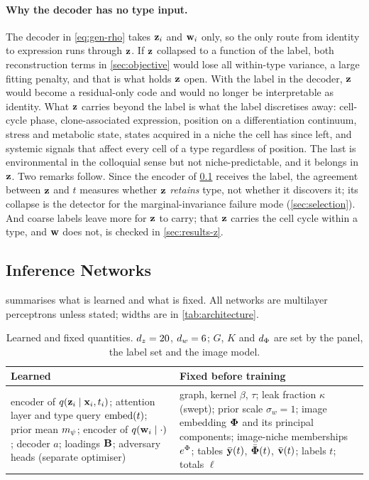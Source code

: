 \paragraph{Why the decoder has no type input.}
The decoder in \cref{eq:gen-rho} takes $\mathbf{z}_i$ and $\mathbf{w}_i$ only, so the only route from identity to expression runs through $\mathbf{z}$. If $\mathbf{z}$ collapsed to a function of the label, both reconstruction terms in \cref{sec:objective} would lose all within-type variance, a large fitting penalty, and that is what holds $\mathbf{z}$ open. With the label in the decoder, $\mathbf{z}$ would become a residual-only code and would no longer be interpretable as identity. What $\mathbf{z}$ carries beyond the label is what the label discretises away: cell-cycle phase, clone-associated expression, position on a differentiation continuum, stress and metabolic state, states acquired in a niche the cell has since left, and systemic signals that affect every cell of a type regardless of position. The last is environmental in the colloquial sense but not niche-predictable, and it belongs in $\mathbf{z}$. Two remarks follow. Since the encoder of \cref{sec:inference} receives the label, the agreement between $\mathbf{z}$ and $t$ measures whether $\mathbf{z}$ \emph{retains} type, not whether it discovers it; its collapse is the detector for the marginal-invariance failure mode (\cref{sec:selection}). And coarse labels leave more for $\mathbf{z}$ to carry; that $\mathbf{z}$ carries the cell cycle within a type, and $\mathbf{w}$ does not, is checked in \cref{sec:results-z}.

\subsection{Inference Networks}
\label{sec:inference}

 summarises what is learned and what is fixed. All networks are multilayer perceptrons unless stated; widths are in \cref{tab:architecture}.

\begin{table}[t]
\centering
\caption{ Learned and fixed quantities. $d_z = 20$, $d_w = 6$; $G$, $K$ and $d_{\Phi}$ are set by the panel, the label set and the image model.}
\label{tab:learned}
\small
\begin{tabular}{@{}p{}p{}@{}}
\toprule
Learned & Fixed before training \\
\midrule
encoder of $q(\mathbf{z}_i \mid \mathbf{x}_i, t_i)$; attention layer and type query $\operatorname{embed}(t)$; prior mean $m_{\psi}$; encoder of $q(\mathbf{w}_i \mid \cdot)$; decoder $a$; loadings $\mathbf{B}$; adversary heads (separate optimiser) &
graph, kernel $\beta$, $\tau$; leak fraction $\kappa$ (swept); prior scale $\sigma_w = 1$; image embedding $\boldsymbol{\Phi}$ and its principal components; image-niche memberships $e^{\Phi}$; tables $\bar{\mathbf{y}}(t)$, $\bar{\boldsymbol{\Phi}}(t)$, $\bar{\mathbf{v}}(t)$; labels $t$; totals $\ell$ \\
\bottomrule
\end{tabular}
\end{table}

